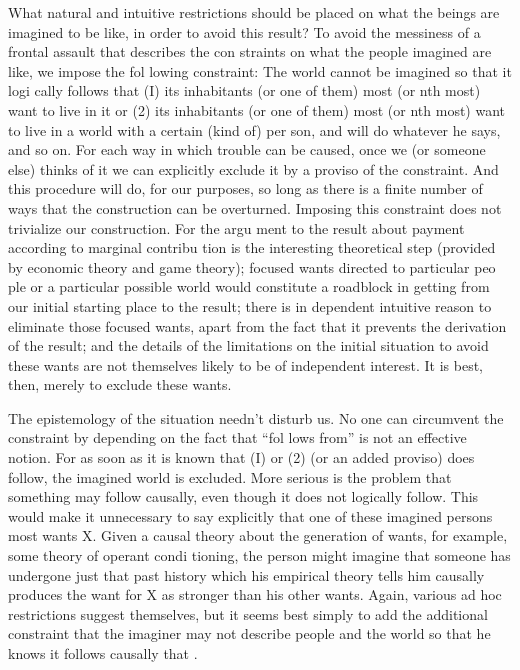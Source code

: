 \documentclass[11pt,openany]{book}
\begin{document}
What natural and intuitive restrictions should be placed on what the beings are imagined to be like, in order to avoid this result? To avoid the messiness of a frontal assault that describes the con straints on what the people imagined are like, we impose the fol lowing constraint: The world cannot be imagined so that it logi cally follows that (I) its inhabitants (or one of them) most (or nth most) want to live in it or (2) its inhabitants (or one of them) most (or nth most) want to live in a world with a certain (kind of) per son, and will do whatever he says, and so on. For each way in which trouble can be caused, once we (or someone else) thinks of it we can explicitly exclude it by a proviso of the constraint. And this procedure will do, for our purposes, so long as there is a finite number of ways that the construction can be overturned. Imposing this constraint does not trivialize our construction. For the argu ment to the result about payment according to marginal contribu tion is the interesting theoretical step (provided by economic theory and game theory); focused wants directed to particular peo ple or a particular possible world would constitute a roadblock in getting from our initial starting place to the result; there is in dependent intuitive reason to eliminate those focused wants, apart from the fact that it prevents the derivation of the result; and the details of the limitations on the initial situation to avoid these wants are not themselves likely to be of independent interest. It is best, then, merely to exclude these wants. 

The epistemology of the situation needn't disturb us. No one can circumvent the constraint by depending on the fact that ``fol lows from'' is not an effective notion. For as soon as it is known that (I) or (2) (or an added proviso) does follow, the imagined world is excluded. More serious is the problem that something may follow causally, even though it does not logically follow. This would make it unnecessary to say explicitly that one of these imagined persons most wants X. Given a causal theory about the generation of wants, for example, some theory of operant condi tioning, the person might imagine that someone has undergone just that past history which his empirical theory tells him causally produces the want for X as stronger than his other wants. Again, various ad hoc restrictions suggest themselves, but it seems best simply to add the additional constraint that the imaginer may not describe people and the world so that he knows it follows causally that . 
\end{document}
